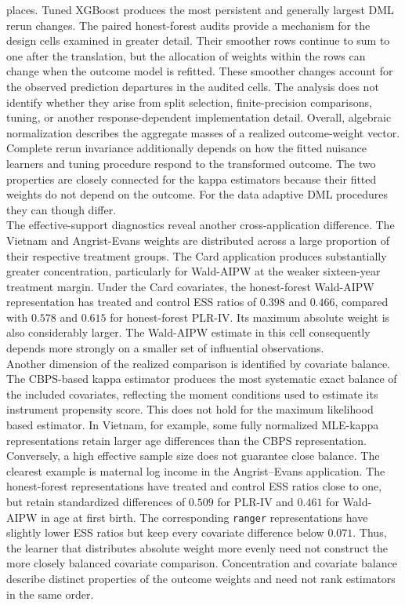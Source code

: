 \documentclass[12pt, a4paper, oneside]{article}
\theoremstyle{plain}
\theoremstyle{definition}
\begin{document}
places. Tuned XGBoost produces the most persistent and generally largest DML
rerun changes.
The paired honest-forest audits provide a mechanism for the design cells
examined in greater detail. Their smoother rows continue to sum to one after
the translation, but the allocation of weights within the rows can change
when the outcome model is refitted. These smoother changes account for the
observed prediction departures in the audited cells. The analysis does not
identify whether they arise from split selection, finite-precision
comparisons, tuning, or another response-dependent implementation detail.
Overall, algebraic normalization describes the aggregate masses of a realized
outcome-weight vector. Complete rerun invariance additionally
depends on how the fitted nuisance learners and tuning procedure respond to
the transformed outcome.
The two properties are closely connected for the
kappa estimators because their fitted weights do not depend on the outcome.
For the data adaptive DML procedures they can though differ. 
\\
The effective-support diagnostics reveal another cross-application
difference. The Vietnam and Angrist-Evans weights are distributed across a
large proportion of their respective treatment groups. The Card application
produces substantially greater concentration, particularly for Wald-AIPW at
the weaker sixteen-year treatment margin. Under the Card covariates, the
honest-forest Wald-AIPW representation has treated and control ESS ratios of
\(0.398\) and \(0.466\), compared with \(0.578\) and \(0.615\) for
honest-forest PLR-IV. Its maximum absolute weight is also considerably larger.
The Wald-AIPW estimate in this cell consequently depends more strongly on a
smaller set of influential observations.\\
Another dimension of the realized comparison is identified by covariate balance.
The CBPS-based kappa estimator produces the most systematic exact balance of
the included covariates, reflecting the moment conditions used to estimate
its instrument propensity score. 
This does not hold for the maximum likelihood based estimator. In Vietnam, for example, some fully normalized MLE-kappa
representations retain larger age differences than the CBPS representation.
Conversely, a high effective sample size does not guarantee close balance.
The clearest example is maternal log income in the Angrist--Evans
application. The honest-forest representations have treated and control ESS
ratios close to one, but retain standardized differences of \(0.509\) for
PLR-IV and \(0.461\) for Wald-AIPW in age at first birth. The corresponding
\texttt{ranger} representations have slightly lower ESS ratios but keep every
covariate difference below \(0.071\). Thus, the learner that distributes
absolute weight more evenly need not construct the more closely balanced
covariate comparison. Concentration and covariate balance describe distinct
properties of the outcome weights and need not rank estimators in the same
order.
\end{document}
